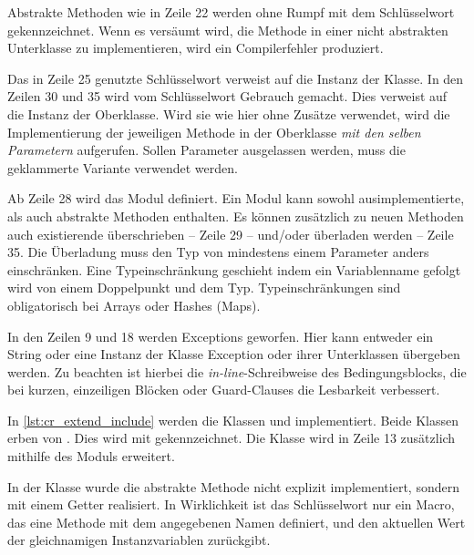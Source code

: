 

Abstrakte Methoden wie in Zeile 22 werden ohne Rumpf mit dem Schlüsselwort
 gekennzeichnet.  Wenn es versäumt wird, die Methode in einer
nicht abstrakten Unterklasse zu implementieren, wird ein Compilerfehler
produziert.

Das in Zeile 25 genutzte Schlüsselwort  verweist auf die Instanz
der Klasse.  In den Zeilen 30 und 35 wird vom Schlüsselwort 
Gebrauch gemacht.  Dies verweist auf die Instanz der Oberklasse.  Wird sie wie
hier ohne Zusätze verwendet, wird die Implementierung der jeweiligen Methode in
der Oberklasse \emph{mit den selben Parametern} aufgerufen.  Sollen Parameter
ausgelassen werden, muss die geklammerte Variante
 verwendet werden.

Ab Zeile 28 wird das Modul  definiert.  Ein Modul kann sowohl
ausimplementierte, als auch abstrakte Methoden enthalten.  Es können zusätzlich
zu neuen Methoden auch existierende überschrieben -- Zeile 29 -- und/oder
überladen werden -- Zeile 35.  Die Überladung muss den Typ von mindestens einem
Parameter anders einschränken.  Eine Typeinschränkung geschieht indem ein
Variablenname gefolgt wird von einem Doppelpunkt und dem Typ.
Typeinschränkungen sind obligatorisch bei Arrays oder Hashes (Maps).

In den Zeilen 9 und 18 werden Exceptions geworfen.  Hier kann entweder ein
String oder eine Instanz der Klasse Exception oder ihrer Unterklassen übergeben
werden.  Zu beachten ist hierbei die \emph{in-line}-Schreibweise des
Bedingungsblocks, die bei kurzen, einzeiligen Blöcken oder Guard-Clauses die
Lesbarkeit verbessert.

In \cref{lst:cr_extend_include} werden die Klassen  und 
implementiert.  Beide Klassen erben von .  Dies wird mit
 gekennzeichnet.  Die Klasse  wird in Zeile 13
zusätzlich mithilfe des Moduls  erweitert.



In der Klasse  wurde die abstrakte Methode  nicht
explizit implementiert, sondern mit einem Getter realisiert.  In Wirklichkeit ist
das Schlüsselwort  nur ein Macro, das eine Methode mit dem
angegebenen Namen definiert, und den aktuellen Wert der gleichnamigen
Instanzvariablen zurückgibt.

